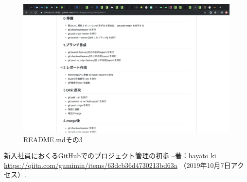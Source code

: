 \documentclass[uplatex,12pt]{jsarticle}
\begin{document}
\newpage

\begin{figure}[!hbt]
  \centering
  \includegraphics[scale=0.20]{git_image/read_me_3.png}
  \caption{README.mdその3}
\end{figure}


\begin{thebibliography}{99}
 新入社員におくるGitHubでのプロジェクト管理の初歩 --著：hayato ki \\
\url{https://qiita.com/gumimin/items/63dcb36d4730213bd63a} （2019年10月7日アクセス）.

\end{thebibliography}
\end{document}
